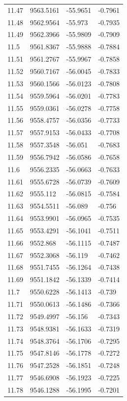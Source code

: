 \begin{table}[H]
\begin{tabular}{llll}
11.47 & 9563.5161 & -55.9651 & -0.7961 \\
11.48 & 9562.9564 & -55.973 & -0.7935 \\
11.49 & 9562.3966 & -55.9809 & -0.7909 \\
11.5 & 9561.8367 & -55.9888 & -0.7884 \\
11.51 & 9561.2767 & -55.9967 & -0.7858 \\
11.52 & 9560.7167 & -56.0045 & -0.7833 \\
11.53 & 9560.1566 & -56.0123 & -0.7808 \\
11.54 & 9559.5964 & -56.0201 & -0.7783 \\
11.55 & 9559.0361 & -56.0278 & -0.7758 \\
11.56 & 9558.4757 & -56.0356 & -0.7733 \\
11.57 & 9557.9153 & -56.0433 & -0.7708 \\
11.58 & 9557.3548 & -56.051 & -0.7683 \\
11.59 & 9556.7942 & -56.0586 & -0.7658 \\
11.6 & 9556.2335 & -56.0663 & -0.7633 \\
11.61 & 9555.6728 & -56.0739 & -0.7609 \\
11.62 & 9555.112 & -56.0815 & -0.7584 \\
11.63 & 9554.5511 & -56.089 & -0.756 \\
11.64 & 9553.9901 & -56.0965 & -0.7535 \\
11.65 & 9553.4291 & -56.1041 & -0.7511 \\
11.66 & 9552.868 & -56.1115 & -0.7487 \\
11.67 & 9552.3068 & -56.119 & -0.7462 \\
11.68 & 9551.7455 & -56.1264 & -0.7438 \\
11.69 & 9551.1842 & -56.1339 & -0.7414 \\
11.7 & 9550.6228 & -56.1413 & -0.739 \\
11.71 & 9550.0613 & -56.1486 & -0.7366 \\
11.72 & 9549.4997 & -56.156 & -0.7343 \\
11.73 & 9548.9381 & -56.1633 & -0.7319 \\
11.74 & 9548.3764 & -56.1706 & -0.7295 \\
11.75 & 9547.8146 & -56.1778 & -0.7272 \\
11.76 & 9547.2528 & -56.1851 & -0.7248 \\
11.77 & 9546.6908 & -56.1923 & -0.7225 \\
11.78 & 9546.1288 & -56.1995 & -0.7201 \\

\end{tabular}
\end{table}

